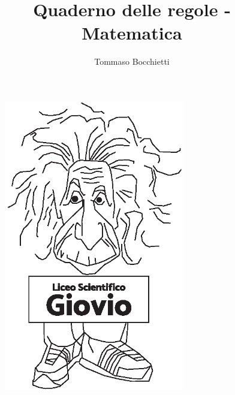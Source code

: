\documentclass{../.common/high-school-notebook}
\begin{document}
\title{Quaderno delle regole - Matematica}
\author{Tommaso Bocchietti}

\maketitle

\begin{figure}[H]
    \centering
    \includegraphics[width=0.7\textwidth]{../.common/Einstein_Logo}
    \label{fig:Einstein_Logo}
\end{figure}


\clearpage
\tableofcontents

% 

% 
% 
% 
% 

\clearpage



% 
% 

% 
% 
% 
% 
% 
% 
% 
% 
\end{document}
